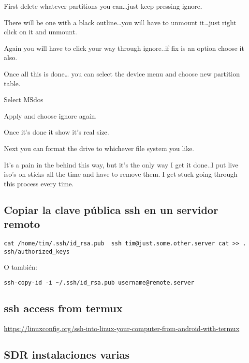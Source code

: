 \documentclass[
  12pt,
  spanish,
]{article}
\begin{document}
First delete whatever partitions you can\ldots just keep pressing
ignore.

There will be one with a black outline\ldots you will have to unmount
it\ldots just right click on it and unmount.

Again you will have to click your way through ignore..if fix is an
option choose it also.

Once all this is done\ldots{} you can select the device menu and choose
new partition table.

Select MSdos

Apply and choose ignore again.

Once it's done it show it's real size.

Next you can format the drive to whichever file system you like.

It's a pain in the behind this way, but it's the only way I get it
done..I put live iso's on sticks all the time and have to remove them. I
get stuck going through this process every time.

\hypertarget{copiar-la-clave-puxfablica-ssh-en-un-servidor-remoto}{%
\subsection{Copiar la clave pública ssh en un servidor
remoto}\label{copiar-la-clave-puxfablica-ssh-en-un-servidor-remoto}}

\texttt{cat\ /home/tim/.ssh/id\_rsa.pub\ \textbar{}\ ssh\ tim@just.some.other.server\ \textquotesingle{}cat\ \textgreater{}\textgreater{}\ .ssh/authorized\_keys\textquotesingle{}}

O también:

\texttt{ssh-copy-id\ -i\ \textasciitilde{}/.ssh/id\_rsa.pub\ username@remote.server}

\hypertarget{ssh-access-from-termux}{%
\subsection{ssh access from termux}\label{ssh-access-from-termux}}

\url{https://linuxconfig.org/ssh-into-linux-your-computer-from-android-with-termux}

\hypertarget{sdr-instalaciones-varias}{%
\subsection{SDR instalaciones varias}\label{sdr-instalaciones-varias}}
\end{document}
